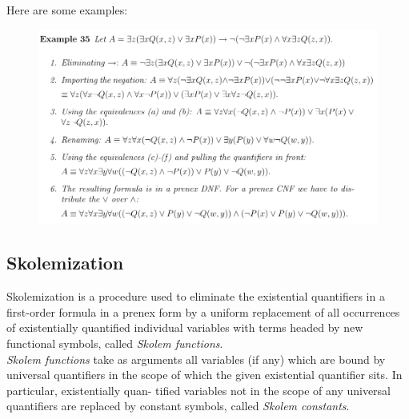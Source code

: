 \documentclass[10pt,a4paper]{article}
\begin{document}
Here are some examples:
\begin{figure}[H]
\includegraphics[scale=0.6]{./figures/prenexex.pdf}
\end{figure}

\subsection{Skolemization}

Skolemization\cite[p. 60]{LecPartII} is a procedure used to eliminate the existential quantifiers in a first-order formula in a prenex form by a uniform replacement of all occurrences of existentially
quantified individual variables with terms headed by new functional symbols, called
\textit{Skolem functions}.\\

\textit{Skolem functions} take as arguments all variables (if any) which are bound by universal quantifiers in the scope of which the given existential quantifier sits. In particular, existentially quan-
tified variables not in the scope of any universal quantifiers are replaced by constant symbols, called \textit{Skolem constants}.
\end{document}
